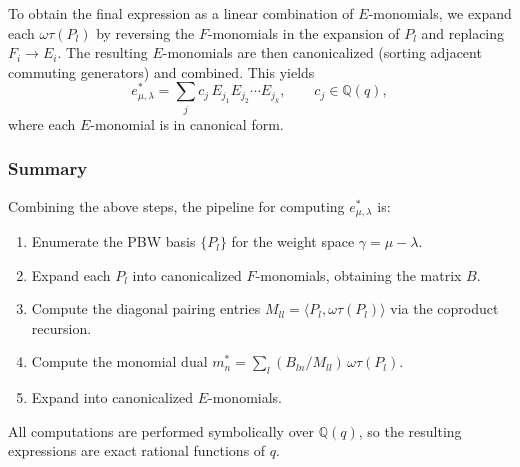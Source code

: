 \documentclass{ximera}
\begin{document}
To obtain the final expression as a linear combination of $E$-monomials, we expand each $\omega\tau(P_l)$ by reversing the $F$-monomials in the expansion of $P_l$ and replacing $F_i \to E_i$. The resulting $E$-monomials are then canonicalized (sorting adjacent commuting generators) and combined. This yields
\[
    e^*_{\mu,\lambda} = \sum_j c_j\, E_{j_1} E_{j_2} \cdots E_{j_k}, \qquad c_j \in \mathbb{Q}(q),
\]
where each $E$-monomial is in canonical form.

\subsubsection*{Summary}

Combining the above steps, the pipeline for computing $e^*_{\mu,\lambda}$ is:
\begin{enumerate}
    \item Enumerate the PBW basis $\{P_l\}$ for the weight space $\gamma = \mu - \lambda$.
    \item Expand each $P_l$ into canonicalized $F$-monomials, obtaining the matrix $B$.
    \item Compute the diagonal pairing entries $M_{ll} = \langle P_l, \omega\tau(P_l) \rangle$ via the coproduct recursion.
    \item Compute the monomial dual $m_n^* = \sum_l (B_{ln} / M_{ll})\, \omega\tau(P_l)$.
    \item Expand into canonicalized $E$-monomials.
\end{enumerate}
All computations are performed symbolically over $\mathbb{Q}(q)$, so the resulting expressions are exact rational functions of $q$.
\end{document}
